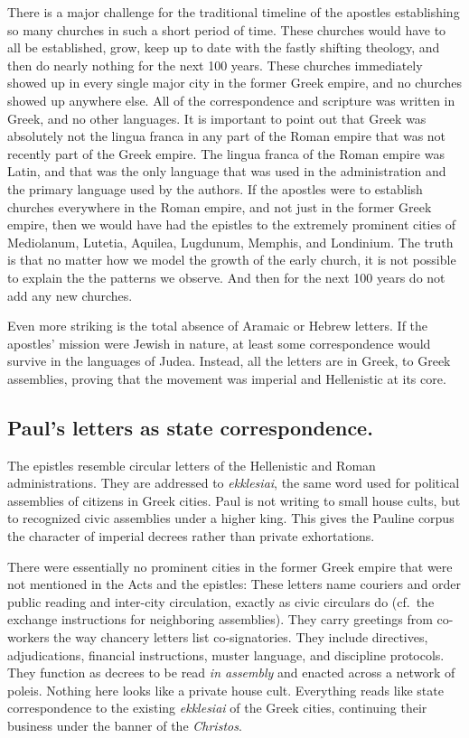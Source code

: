 There is a major challenge for the traditional timeline of the apostles establishing so many churches in such a short period of time.
These churches would have to all be established, grow, keep up to date with the fastly shifting theology, and then do nearly nothing for the next 100 years.
These churches immediately showed up in every single major city in the former Greek empire, and no churches showed up anywhere else.
All of the correspondence and scripture was written in Greek, and no other languages.
It is important to point out that Greek was absolutely not the lingua franca in any part of the Roman empire that was not recently part of the Greek empire.
The lingua franca of the Roman empire was Latin, and that was the only language that was used in the administration and the primary language used by the authors.
If the apostles were to establish churches everywhere in the Roman empire, and not just in the former Greek empire, then we would have had the epistles to the extremely prominent cities of Mediolanum, Lutetia, Aquilea, Lugdunum, Memphis, and Londinium.
The truth is that no matter how we model the growth of the early church, it is not possible to explain the the patterns we observe.
And then for the next 100 years do not add any new churches.

Even more striking is the total absence of Aramaic or Hebrew letters.
If the apostles’ mission were Jewish in nature, at least some correspondence would survive in the languages of Judea.
Instead, all the letters are in Greek, to Greek assemblies, proving that the movement was imperial and Hellenistic at its core.

\subsection{Paul’s letters as state correspondence.}\label{subsec:pauls-letters-as-state-correspondence.}

The epistles resemble circular letters of the Hellenistic and Roman administrations.
They are addressed to \textit{ekklesiai}, the same word used for political assemblies of citizens in Greek cities.
Paul is not writing to small house cults, but to recognized civic assemblies under a higher king.
This gives the Pauline corpus the character of imperial decrees rather than private exhortations.

There were essentially no prominent cities in the former Greek empire that were not mentioned in the Acts and the epistles:
These letters name couriers and order public reading and inter-city circulation, exactly as civic circulars do (cf.\ the exchange instructions for neighboring assemblies).
They carry greetings from co-workers the way chancery letters list co-signatories.
They include directives, adjudications, financial instructions, muster language, and discipline protocols.
They function as decrees to be read \emph{in assembly} and enacted across a network of poleis.
Nothing here looks like a private house cult.
Everything reads like state correspondence to the existing \textit{ekklesiai} of the Greek cities, continuing their business under the banner of the \textit{Christos}.

